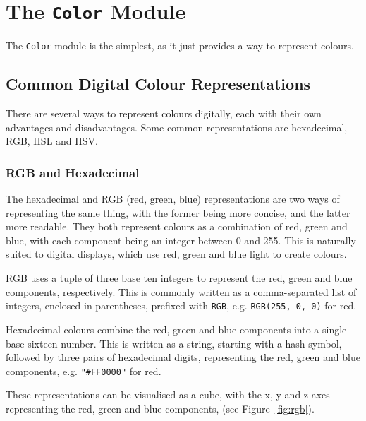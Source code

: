 \documentclass[../main.tex]{subfiles}
\begin{document}
    \section{The \texttt{Color}
        Module} The \texttt{Color} module is the simplest, as it just provides a way to
            represent colours.

        \subsection{Common Digital Colour Representations}
            There are several ways to represent colours digitally, each with their own
                advantages and disadvantages.
            Some common representations are hexadecimal, RGB, HSL and HSV.

            \subsubsection{RGB and Hexadecimal}
                The hexadecimal and RGB (red, green, blue) representations are two ways of
                    representing the same thing, with the former being more concise, and the latter
                    more readable.
                They both represent colours as a combination of red, green and blue, with each
                    component being an integer between 0 and 255.
                This is naturally suited to digital displays, which use red, green and blue
                    light to create colours.

                RGB uses a tuple of three base ten integers to represent the red, green and
                    blue components, respectively.
                This is commonly written as a comma-separated list of integers, enclosed in
                    parentheses, prefixed with \texttt{RGB}, e.g. \texttt{RGB(255, 0, 0)} for red.

                Hexadecimal colours combine the red, green and blue components into a single
                    base sixteen number.
                This is written as a string, starting with a hash symbol, followed by three
                    pairs of hexadecimal digits, representing the red, green and blue components,
                    e.g. \texttt{"\#FF0000"} for red.

                These representations can be visualised as a cube, with the x, y and z axes
                    representing the red, green and blue components, (see Figure~\ref{fig:rgb}).
\end{document}
